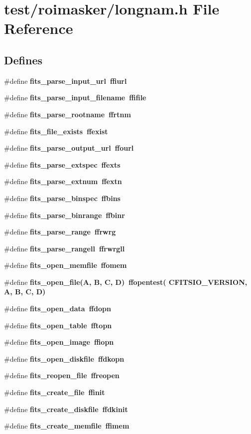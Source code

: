 \section{test/roimasker/longnam.h File Reference}
\label{test_2roimasker_2longnam_8h}
\subsection*{Defines}
\begin{CompactItemize}
\item 
\#define \bf{fits\_\-parse\_\-input\_\-url}~ffiurl
\item 
\#define \bf{fits\_\-parse\_\-input\_\-filename}~ffifile
\item 
\#define \bf{fits\_\-parse\_\-rootname}~ffrtnm
\item 
\#define \bf{fits\_\-file\_\-exists}~ffexist
\item 
\#define \bf{fits\_\-parse\_\-output\_\-url}~ffourl
\item 
\#define \bf{fits\_\-parse\_\-extspec}~ffexts
\item 
\#define \bf{fits\_\-parse\_\-extnum}~ffextn
\item 
\#define \bf{fits\_\-parse\_\-binspec}~ffbins
\item 
\#define \bf{fits\_\-parse\_\-binrange}~ffbinr
\item 
\#define \bf{fits\_\-parse\_\-range}~ffrwrg
\item 
\#define \bf{fits\_\-parse\_\-rangell}~ffrwrgll
\item 
\#define \bf{fits\_\-open\_\-memfile}~ffomem
\item 
\#define \bf{fits\_\-open\_\-file}(A, B, C, D)~ffopentest( CFITSIO\_\-VERSION, A, B, C, D)
\item 
\#define \bf{fits\_\-open\_\-data}~ffdopn
\item 
\#define \bf{fits\_\-open\_\-table}~fftopn
\item 
\#define \bf{fits\_\-open\_\-image}~ffiopn
\item 
\#define \bf{fits\_\-open\_\-diskfile}~ffdkopn
\item 
\#define \bf{fits\_\-reopen\_\-file}~ffreopen
\item 
\#define \bf{fits\_\-create\_\-file}~ffinit
\item 
\#define \bf{fits\_\-create\_\-diskfile}~ffdkinit
\item 
\#define \bf{fits\_\-create\_\-memfile}~ffimem
\item 

\end{CompactItemize}
